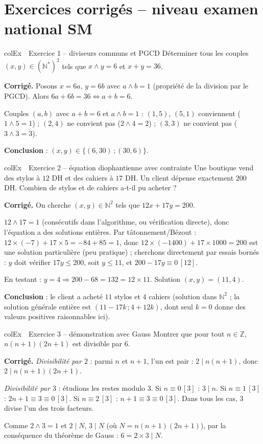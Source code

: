 \documentclass[11pt,a4paper]{article}
\newenvironment{exemple}[1][Exemple]
  {\begin{fiche}{colEx}{\ding{217}~~#1}}{\end{fiche}}
\begin{document}
\section{Exercices corrigés -- niveau examen national SM}

\begin{exemple}[Exercice 1 -- diviseurs communs et PGCD]
Déterminer tous les couples $(x,y)\in(\mathbb{N}^*)^2$ tels que $x\wedge y=6$ et $x+y=36$.

\smallskip
\textbf{Corrigé.} Posons $x=6a$, $y=6b$ avec $a\wedge b=1$ (propriété de la division par le PGCD). Alors $6a+6b=36\iff a+b=6$.

\smallskip
Couples $(a,b)$ avec $a+b=6$ et $a\wedge b=1$ : $(1,5)$, $(5,1)$ conviennent ($1\wedge5=1$) ; $(2,4)$ ne convient pas ($2\wedge4=2$) ; $(3,3)$ ne convient pas ($3\wedge3=3$).

\smallskip
\textbf{Conclusion} : $(x,y)\in\{(6,30)\,;(30,6)\}$.
\end{exemple}

\begin{exemple}[Exercice 2 -- équation diophantienne avec contrainte]
Une boutique vend des stylos à $12$ DH et des cahiers à $17$ DH. Un client dépense exactement $200$ DH. Combien de stylos et de cahiers a-t-il pu acheter ?

\smallskip
\textbf{Corrigé.} On cherche $(x,y)\in\mathbb{N}^2$ tels que $12x+17y=200$.

\smallskip
$12\wedge17=1$ (consécutifs dans l'algorithme, ou vérification directe), donc l'équation a des solutions entières. Par tâtonnement/Bézout : $12\times(-7)+17\times5=-84+85=1$, donc $12\times(-1400)+17\times1000=200$ est une solution particulière (peu pratique) ; cherchons directement par essais bornés : $y$ doit vérifier $17y\leq200$, soit $y\leq11$, et $200-17y\equiv0\,[12]$.

\smallskip
En testant : $y=4\Rightarrow200-68=132=12\times11$. Solution $(x,y)=(11,4)$.

\smallskip
\textbf{Conclusion} : le client a acheté $11$ stylos et $4$ cahiers (solution dans $\mathbb{N}^2$ ; la solution générale entière est $(11-17k\,;4+12k)$, dont seul $k=0$ donne des valeurs positives raisonnables ici).
\end{exemple}

\begin{exemple}[Exercice 3 -- démonstration avec Gauss]
Montrer que pour tout $n\in\mathbb{Z}$, $n(n+1)(2n+1)$ est divisible par $6$.

\smallskip
\textbf{Corrigé.} \emph{Divisibilité par $2$} : parmi $n$ et $n+1$, l'un est pair : $2\mid n(n+1)$, donc $2\mid n(n+1)(2n+1)$.

\smallskip
\emph{Divisibilité par $3$} : étudions les restes modulo $3$. Si $n\equiv0\,[3]$ : $3\mid n$. Si $n\equiv1\,[3]$ : $2n+1\equiv3\equiv0\,[3]$. Si $n\equiv2\,[3]$ : $n+1\equiv3\equiv0\,[3]$. Dans tous les cas, $3$ divise l'un des trois facteurs.

\smallskip
Comme $2\wedge3=1$ et $2\mid N$, $3\mid N$ (où $N=n(n+1)(2n+1)$), par la conséquence du théorème de Gauss : $6=2\times3\mid N$.
\end{exemple}
\end{document}

